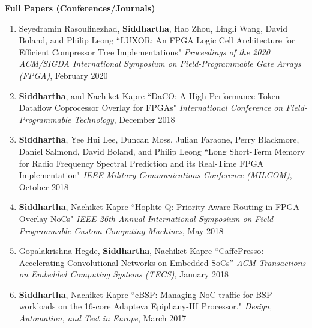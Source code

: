 \documentclass[10pt]{article}
\begin{document}
{\begin{adjustwidth}{-1.25in}{}
        \textbf{\large Full Papers (Conferences/Journals)}
        \vspace{0in}
        \begin{enumerate}
            \item Seyedramin Rasoulinezhad, {\bf Siddhartha}, Hao Zhou, Lingli Wang, David Boland, and Philip Leong ``LUXOR: An FPGA Logic Cell Architecture for Efficient Compressor Tree Implementations" \emph{Proceedings of the 2020 ACM/SIGDA International Symposium on Field-Programmable Gate Arrays (FPGA)}, February 2020
            \item {\bf Siddhartha}, and Nachiket Kapre ``DaCO: A High-Performance Token Dataflow Coprocessor Overlay for FPGAs" \emph{International Conference on Field-Programmable Technology}, December 2018
            \item {\bf Siddhartha}, Yee Hui Lee, Duncan Moss, Julian Faraone, Perry Blackmore, Daniel Salmond, David Boland, and Philip Leong ``Long Short-Term Memory for Radio Frequency Spectral Prediction and its Real-Time FPGA Implementation" \emph{IEEE Military Communications Conference (MILCOM)}, October 2018
            \item {\bf Siddhartha}, Nachiket Kapre ``Hoplite-Q: Priority-Aware Routing in FPGA Overlay NoCs" \emph{IEEE 26th Annual International Symposium on Field-Programmable Custom Computing Machines}, May 2018
            \item Gopalakrishna Hegde, {\bf Siddhartha}, Nachiket Kapre ``CaffePresso: Accelerating Convolutional Networks on Embedded SoCs'' \emph{ACM Transactions on Embedded Computing Systems (TECS)}, January 2018
            \item {\bf Siddhartha}, Nachiket Kapre ``eBSP: Managing NoC traffic for BSP workloads on the 16-core Adapteva Epiphany-III Processor." \emph{Design, Automation, and Test in Europe}, March 2017

\end{enumerate}
\end{adjustwidth}}
\end{document}

